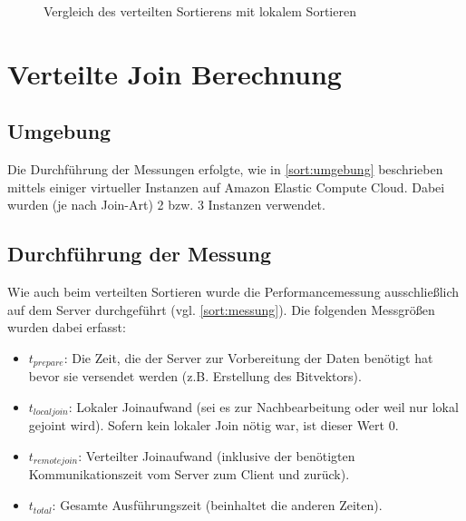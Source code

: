 \documentclass[fontsize=12pt,a4paper,headinclude=no,headings=small]{scrartcl}
\begin{document}
\begin{figure}[H]
	\centering
	\caption{Vergleich des verteilten Sortierens mit lokalem Sortieren}
	\label{fig.local.compare}
\end{figure}

\section{Verteilte Join Berechnung}
\subsection{Umgebung}
Die Durchführung der Messungen erfolgte, wie in \ref{sort:umgebung} beschrieben mittels einiger virtueller Instanzen auf Amazon Elastic Compute Cloud. Dabei wurden (je nach Join-Art) 2 bzw. 3 Instanzen verwendet.

\subsection{Durchführung der Messung}
Wie auch beim verteilten Sortieren wurde die Performancemessung ausschließlich auf dem Server durchgeführt (vgl. \ref{sort:messung}). Die folgenden Messgrößen wurden dabei erfasst:
\begin{itemize}
  \item $t_{prepare}$: Die Zeit, die der Server zur Vorbereitung der Daten benötigt hat bevor sie versendet werden (z.B. Erstellung des Bitvektors).
  \item $t_{localjoin}$: Lokaler Joinaufwand (sei es zur Nachbearbeitung oder weil nur lokal gejoint wird). Sofern kein lokaler Join nötig war, ist dieser Wert 0.
  \item $t_{remotejoin}$: Verteilter Joinaufwand (inklusive der benötigten Kommunikationszeit vom Server zum Client und zurück).
  \item $t_{total}$: Gesamte Ausführungszeit (beinhaltet die anderen Zeiten).
\end{itemize}
\end{document}
